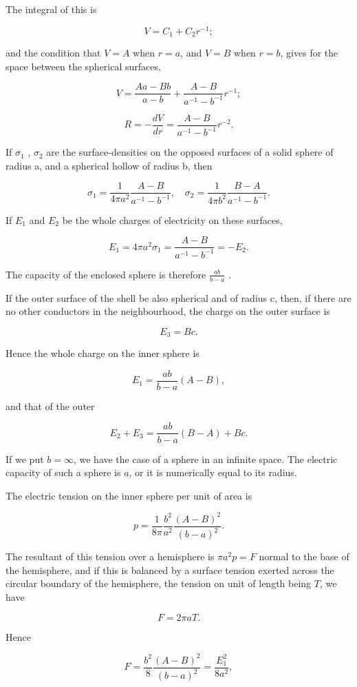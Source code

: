\documentclass[11pt,a4paper]{article}
\begin{document}
The integral of this is

\[
V=C_1+C_2r^{-1};
\]

and the condition that $V=A$ when $r=a$, and $V=B$ when $r=b$, gives for the space between the spherical surfaces,

\[
V = \frac{Aa - Bb}{a - b} + \frac{A - B}{a^{-1} - b^{-1}} r^{-1};
\]

\[
R = -\frac{dV}{dr} = \frac{A - B}{a^{-1} - b^{-1}} r^{-2}.
\]

If  $\sigma_1$ ,  $\sigma_2$  are the surface-densities on the opposed surfaces of a solid sphere of radius a, and a spherical hollow of radius b, then

\[
\sigma_1 = \frac{1}{4\pi a^2} \frac{A - B}{a^{-1} - b^{-1}}, \quad \sigma_2 = \frac{1}{4\pi b^2} \frac{B - A}{a^{-1} - b^{-1}}.
\]

If  $E_1$  and  $E_2$  be the whole charges of electricity on these surfaces,

\[
E_1 = 4\pi a^2 \sigma_1 = \frac{A - B}{a^{-1} - b^{-1}} = -E_2.
\]

The capacity of the enclosed sphere is therefore  $\frac{ab}{b-a}$ .

If the outer surface of the shell be also spherical and of radius c, then, if there are no other conductors in the neighbourhood, the charge on the outer surface is

\[
E_3=Bc.
\]

Hence the whole charge on the inner sphere is

\[
E_1 = \frac{ab}{b-a}(A-B),
\]

and that of the outer

\[
E_2 + E_3 = \frac{ab}{b-a}(B-A) + Bc.
\]

If we put $b=\infty$, we have the case of a sphere in an infinite space. The electric capacity of such a sphere is $a$, or it is numerically equal to its radius.

The electric tension on the inner sphere per unit of area is

\[
p = \frac{1}{8\pi} \frac{b^2}{a^2} \frac{(A-B)^2}{(b-a)^2}.
\]

The resultant of this tension over a hemisphere is $\pi a^2p=F$ normal to the base of the hemisphere, and if this is balanced by a surface tension exerted across the circular boundary of the hemisphere, the tension on unit of length being $T$, we have

\[
F=2\pi aT.
\]

Hence

\[
F = \frac{b^2}{8} \frac{(A-B)^2}{(b-a)^2} = \frac{E_1^2}{8a^2},
\]
\end{document}

